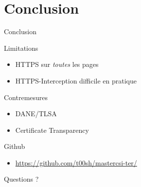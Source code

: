 \section{Conclusion}
\begin{frame}{Conclusion}
  \begin{block}{Limitations}
    \begin{itemize}
    \item{HTTPS sur \emph{toutes} les pages}
    \item{HTTPS-Interception difficile en pratique}
    \end{itemize}
  \end{block}
  \begin{block}{Contremesures}
    \begin{itemize}
    \item{DANE/TLSA}
    \item{Certificate Transparency}
    \end{itemize}
  \end{block}

  \begin{exampleblock}{Github}
    \begin{itemize}
    \item \url{https://github.com/t00sh/mastercsi-ter/}
    \end{itemize}
  \end{exampleblock}
      { \Large \centerline{Questions ?} }

\end{frame}
